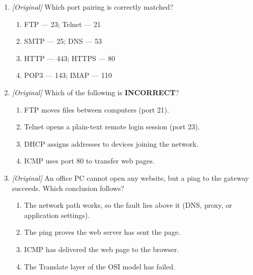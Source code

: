 \begin{enumerate}[label=\textbf{Q\arabic*.}, leftmargin=*]
\item \textit{[Original]} Which port pairing is correctly matched?
  \begin{enumerate}[label=\Alph*.]
    \item FTP --- 23; Telnet --- 21
    \item SMTP --- 25; DNS --- 53
    \item HTTP --- 443; HTTPS --- 80
    \item POP3 --- 143; IMAP --- 110
  \end{enumerate}
\item \textit{[Original]} Which of the following is \textbf{INCORRECT}?
  \begin{enumerate}[label=\Alph*.]
    \item FTP moves files between computers (port 21).
    \item Telnet opens a plain-text remote login session (port 23).
    \item DHCP assigns addresses to devices joining the network.
    \item ICMP uses port 80 to transfer web pages.
  \end{enumerate}
\item \textit{[Original]} An office PC cannot open any website, but a ping to
  the gateway succeeds. Which conclusion follows?
  \begin{enumerate}[label=\Alph*.]
    \item The network path works, so the fault lies above it (DNS, proxy,
      or application settings).
    \item The ping proves the web server has sent the page.
    \item ICMP has delivered the web page to the browser.
    \item The Translate layer of the OSI model has failed.
  \end{enumerate}


\end{enumerate}
